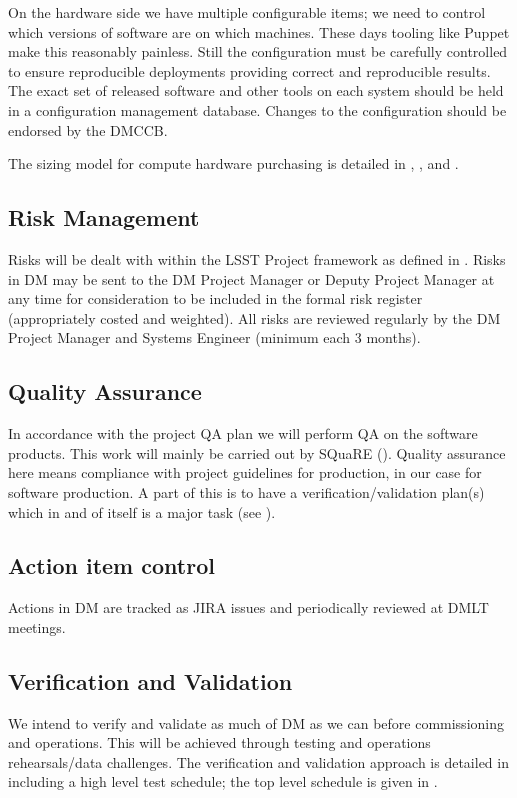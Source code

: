 On the hardware side we have multiple configurable items; we need to control which versions of software are on which machines. These days tooling like Puppet make this reasonably painless. Still the configuration  must be carefully controlled to ensure reproducible deployments providing correct and reproducible results. The exact set of released software and other tools on each system should be held in a configuration management database.
Changes to the configuration should be endorsed by the DMCCB.

The sizing model for compute hardware purchasing is detailed in , , and .

\subsection {Risk Management } \label{sect:risk}

Risks will be dealt with within the LSST Project framework as defined in .
Risks in DM may be sent to the DM Project Manager or Deputy Project Manager at any time for consideration to be included in the formal risk register (appropriately costed and weighted). All risks are reviewed regularly by the DM Project Manager and Systems Engineer (minimum each 3 months).


\subsection {Quality Assurance  } \label{sect:pa}

In accordance with the project QA plan  we will perform QA on the software products.
This work will mainly be carried out by SQuaRE ().
Quality assurance here means compliance with project guidelines for production, in our case for software production.
A part of this is to have a verification/validation plan(s) which in and of itself is a major task (see ).


\subsection{Action item control}
Actions in DM are tracked as JIRA issues and periodically reviewed at DMLT meetings.


\subsection {Verification and Validation } \label{sect:vanv}

We intend to verify and validate as much of DM as we can before commissioning and operations.
This will be achieved through testing and operations rehearsals/data challenges.
The verification and validation approach is detailed in  including a high level test schedule;
the top level schedule is given in .
